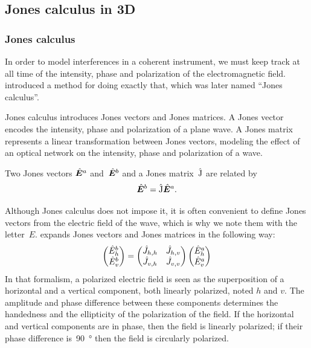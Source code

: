 
\subsection{Jones calculus in 3D}



\subsubsection{Jones calculus}

In order to model interferences in a coherent instrument, we must keep track at all time of the intensity, phase and polarization of the electromagnetic field.
\textcite{jones1941calculus} introduced a method for doing exactly that,
which was later named ``Jones calculus''.

Jones calculus introduces Jones vectors and Jones matrices.
A Jones vector encodes the intensity, phase and polarization of a plane wave.
A Jones matrix represents a linear transformation between Jones vectors, modeling the effect of an optical network on the intensity, phase and polarization of a wave.

Two Jones vectors $\hat{\bm{E}}^a$ and~$\hat{\bm{E}}^b$ and a Jones matrix~$\hat{\mathrm{J}}$ are related by
\begin{equation}
    \hat{\bm{E}}^b = \hat{\mathrm{J}} \hat{\bm{E}}^a
    \label{eq:jones_matrix_short}
    \text{.}
\end{equation}

Although Jones calculus does not impose it, it is often convenient to define Jones vectors from the electric field of the wave, which is why we note them with the letter~$E$.
\Textcite{hecht2002optics} expands Jones vectors and Jones matrices in the following way:
\begin{equation}
    \begin{pmatrix}
        \hat{E}^b_h\\
        \hat{E}^b_v
    \end{pmatrix}
    =
    \begin{pmatrix}
        \hat{J}_{h, h}   &   \hat{J}_{h, v} \\
        \hat{J}_{v, h}   &   \hat{J}_{v, v}
    \end{pmatrix}
    \begin{pmatrix}
        \hat{E}^a_h\\
        \hat{E}^a_v
    \end{pmatrix}
    \label{eq:jones_matrix_2d}
\end{equation}
In that formalism,
a polarized electric field is seen as the superposition of a horizontal and a vertical component, both linearly polarized, noted $h$ and $v$.
The amplitude and phase difference between these components determines the handedness and the ellipticity of the polarization of the field.
If the horizontal and vertical components are in phase, then the field is linearly polarized; if their phase difference is~\SI{90}{\degree} then the field is circularly polarized.

